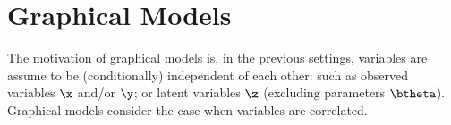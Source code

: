 
\chapter{Graphical Models}
The motivation of graphical models is, in the previous settings, variables are assume to be (conditionally) independent of each other: such as observed variables $\x$ and/or $\y$; or latent variables $\z$ (excluding parameters $\btheta$). Graphical models consider the case when variables are correlated.